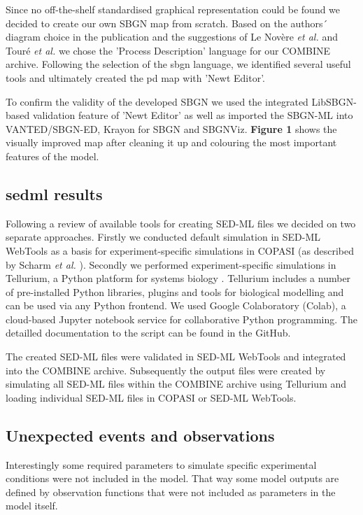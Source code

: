 Since no off-the-shelf standardised graphical representation could be found we decided to create our own SBGN map from scratch. Based on the authors´ diagram choice in the publication and the suggestions of Le Novère \textit{et al.} \cite{sbgnnovere} and Touré \textit{et al.} \cite{sbgntoure} we chose the 'Process Description' language for our COMBINE archive. Following the selection of the \ac{sbgn} language, we identified several useful tools and ultimately created the \ac{pd} map with 'Newt Editor'. 

To confirm the validity of the developed SBGN we used the integrated LibSBGN-based validation feature of 'Newt Editor' as well as imported the SBGN-ML into VANTED/SBGN-ED, Krayon for SBGN and SBGNViz. \textbf{Figure 1} shows the visually improved map after cleaning it up and colouring the most important features of the model.

\subsection*{\acf{sedml} results}

Following a review of available tools for creating SED-ML files \cite{sedmltool} we decided on two separate approaches. Firstly we conducted default simulation in SED-ML WebTools as a basis for experiment-specific simulations in COPASI (as described by Scharm \textit{et al.} \cite{combine}). Secondly we performed experiment-specific simulations in Tellurium, a Python platform for systems biology \cite{tellurium}. Tellurium includes a number of pre-installed Python libraries, plugins and tools for biological modelling and can be used via any Python frontend. We used Google Colaboratory (Colab), a cloud-based Jupyter notebook service for collaborative Python programming. The detailled documentation to the script can be found in the GitHub.

The created SED-ML files were validated in SED-ML WebTools and integrated into the COMBINE archive. Subsequently the output files were created by simulating all SED-ML files within the COMBINE archive using Tellurium and loading individual SED-ML files in COPASI or SED-ML WebTools. 

\subsection*{Unexpected events and observations}
Interestingly some required parameters to simulate specific experimental conditions were not included in the model. That way some model outputs are defined by observation functions that were not included as parameters in the model itself. 

